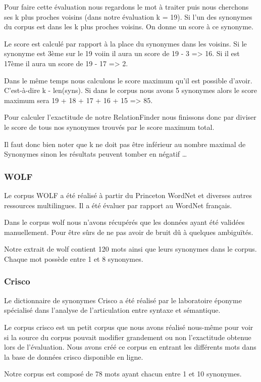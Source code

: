 Pour faire cette évaluation nous regardons le mot à traiter puis nous cherchons 
ses k plus proches voisins (dans notre évaluation k = 19). Si l'un des 
synonymes du corpus est dans les k plus proches voisins. On donne un score à ce 
synonyme.

Le score est calculé par rapport à la place du synonymes dans les voisins. Si 
le synonyme est 3ème sur le 19 voiin il aura un score de 19 - 3 => 16. Si il 
est 17ème il aura un score de 19 - 17 => 2.

Dans le même temps nous calculons le score maximum qu'il est possible d'avoir. 
C'est-à-dire k - len(syns). Si dans le corpus nous avons 5 synonymes alors le 
score maximum sera 19 + 18 + 17 + 16 + 15 => 85.

Pour calculer l'exactitude de notre RelationFinder nous finissons donc par 
diviser le score de tous nos synonymes trouvés par le score maximum total.

Il faut donc bien noter que k ne doit pas être inférieur au nombre maximal de 
Synonymes sinon les résultats peuvent tomber en négatif \dots

\subsubsection{WOLF}

Le corpus WOLF a été réalisé à partir du Princeton WordNet et diverses autres 
ressources multilingues. Il a été évaluer par rapport au WordNet français.

Dans le corpus wolf nous n'avons récupérés que les données ayant été validées 
manuellement. Pour être sûrs de ne pas avoir de bruit dû à quelques ambiguïtés.

Notre extrait de wolf contient 120 mots ainsi que leurs synonymes dans le 
corpus. Chaque mot possède entre 1 et 8 synonymes.

\subsubsection{Crisco}

Le dictionnaire de synonymes Crisco a été réalisé par le laboratoire éponyme 
spécialisé dans l’analyse de l’articulation entre syntaxe et sémantique.

Le corpus crisco est un petit corpus que nous avons réalisé nous-même pour voir 
si la source du corpus pouvait modifier grandement ou non l'exactitude obtenue 
lors de l'évaluation. Nous avons créé ce corpus en entrant les différents mots 
dans la base de données crisco disponible en ligne.

Notre corpus est composé de 78 mots ayant chacun entre 1 et 10 synonymes.
